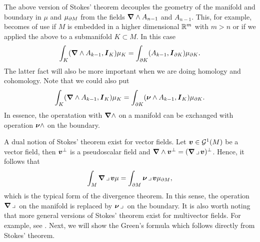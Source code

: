 \documentclass{article}
\begin{document}
The above version of Stokes' theorem decouples the geometry of the manifold and boundary in $\mu$ and $\mu_{\partial M}$ from the fields $\boldsymbol{\nabla} \wedge A_{n-1}$ and $A_{n-1}$. This, for example, becomes of use if $M$ is embedded in a higher dimensional $\mathbb{R}^m$ with $m>n$ or if we applied the above to a submanifold $K\subset M$. In this case
\begin{equation}
    \int_K (\boldsymbol{\nabla} \wedge A_{k-1},\boldsymbol{I}_K)\mu_K = \int_{\partial K} (A_{k-1},\boldsymbol{I}_{\partial K})\mu_{\partial K}.
\end{equation}
The latter fact will also be more important when we are doing homology and cohomology. Note that we could also put
\begin{equation}
    \int_K (\boldsymbol{\nabla} \wedge A_{k-1}, \boldsymbol{I}_K)\mu_K = \int_{\partial K} (\boldsymbol{\nu} \wedge A_{k-1}, \boldsymbol{I}_K)\mu_{\partial K}.
\end{equation}
In essence, the operatation with $\boldsymbol{\nabla} \wedge$ on a manifold can be exchanged with operation $\boldsymbol{\nu} \wedge$ on the boundary.

A dual notion of Stokes' theorem exist for vector fields. Let $\boldsymbol{v} \in \mathcal{G}^1(M)$ be a vector field, then $\boldsymbol{v}^\perp$ is a pseudoscalar field and $\boldsymbol{\nabla} \wedge \boldsymbol{v}^\perp = (\boldsymbol{\nabla} \hspace*{.5mm}\lrcorner \hspace*{.5mm} \boldsymbol{v})^\perp$. Hence, it follows that
\begin{equation}
\label{eq:divergence_theorem}
    \int_M \boldsymbol{\nabla} \hspace*{.5mm}\lrcorner \hspace*{.5mm} \boldsymbol{v} \mu = \int_{\partial M} \boldsymbol{\nu} \hspace*{.5mm}\lrcorner \hspace*{.5mm} \boldsymbol{v} \mu_{\partial M},
\end{equation}
which is the typical form of the divergence theorem. In this sense, the operation $\boldsymbol{\nabla} \hspace*{.5mm}\lrcorner \hspace*{.5mm}$ on the manifold is replaced by $\boldsymbol{\nu} \hspace*{.5mm}\lrcorner \hspace*{.5mm}$ on the boundary. It is also worth noting that more general versions of Stokes' theorem exist for multivector fields. For example, see \cite{doran_geometric_2003}. Next, we will show the Green's formula which follows directly from Stokes' theorem.
\end{document}
